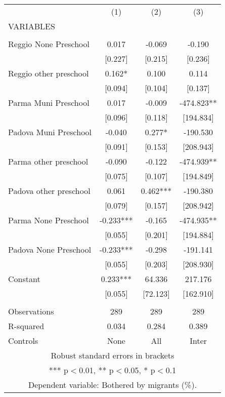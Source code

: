 \begin{tabular}{lccc} \hline
 & (1) & (2) & (3) \\
VARIABLES &  &  &  \\ \hline
 &  &  &  \\
Reggio None Preschool & 0.017 & -0.069 & -0.190 \\
 & [0.227] & [0.215] & [0.236] \\
Reggio other preschool & 0.162* & 0.100 & 0.114 \\
 & [0.094] & [0.104] & [0.137] \\
Parma Muni Preschool & 0.017 & -0.009 & -474.823** \\
 & [0.096] & [0.118] & [194.834] \\
Padova Muni Preschool & -0.040 & 0.277* & -190.530 \\
 & [0.091] & [0.153] & [208.943] \\
Parma other preschool & -0.090 & -0.122 & -474.939** \\
 & [0.075] & [0.107] & [194.849] \\
Padova other preschool & 0.061 & 0.462*** & -190.380 \\
 & [0.079] & [0.157] & [208.942] \\
Parma None Preschool & -0.233*** & -0.165 & -474.935** \\
 & [0.055] & [0.201] & [194.884] \\
Padova None Preschool & -0.233*** & -0.298 & -191.141 \\
 & [0.055] & [0.203] & [208.930] \\
Constant & 0.233*** & 64.336 & 217.176 \\
 & [0.055] & [72.123] & [162.910] \\
 &  &  &  \\
Observations & 289 & 289 & 289 \\
R-squared & 0.034 & 0.284 & 0.389 \\
 Controls & None & All & Inter \\ \hline
\multicolumn{4}{c}{ Robust standard errors in brackets} \\
\multicolumn{4}{c}{ *** p$<$0.01, ** p$<$0.05, * p$<$0.1} \\
\multicolumn{4}{c}{ Dependent variable: Bothered by migrants (\%).} \\
\end{tabular}
